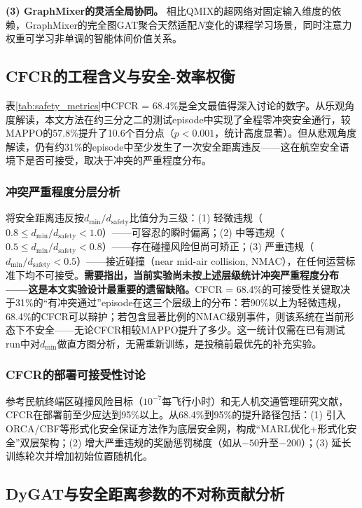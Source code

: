\documentclass[12pt,a4paper,UTF8]{ctexart}
\begin{document}
\textbf{(3) GraphMixer的灵活全局协同。} 相比QMIX的超网络对固定输入维度的依赖，GraphMixer的完全图GAT聚合天然适配$N$变化的课程学习场景，同时注意力权重可学习非单调的智能体间价值关系。

\subsection{CFCR的工程含义与安全-效率权衡}

表\ref{tab:safety_metrics}中CFCR = 68.4\%是全文最值得深入讨论的数字。从乐观角度解读，本文方法在约三分之二的测试episode中实现了全程零冲突安全通行，较MAPPO的57.8\%提升了10.6个百分点（$p<0.001$，统计高度显著）。但从悲观角度解读，仍有约31\%的episode中至少发生了一次安全距离违反——这在航空安全语境下是否可接受，取决于冲突的严重程度分布。

\subsubsection{冲突严重程度分层分析}

将安全距离违反按$d_{\min}/d_{\text{safety}}$比值分为三级：(1) 轻微违规（$0.8 \leq d_{\min}/d_{\text{safety}} < 1.0$）——可容忍的瞬时偏离；(2) 中等违规（$0.5 \leq d_{\min}/d_{\text{safety}} < 0.8$）——存在碰撞风险但尚可矫正；(3) 严重违规（$d_{\min}/d_{\text{safety}} < 0.5$）——接近碰撞（near mid-air collision, NMAC），在任何运营标准下均不可接受。\textbf{需要指出，当前实验尚未按上述层级统计冲突严重程度分布——这是本文实验设计最重要的遗留缺陷。}CFCR = 68.4\%的可接受性关键取决于31\%的``有冲突通过''episode在这三个层级上的分布：若90\%以上为轻微违规，68.4\%的CFCR可以辩护；若包含显著比例的NMAC级别事件，则该系统在当前形态下不安全——无论CFCR相较MAPPO提升了多少。这一统计仅需在已有测试run中对$d_{\min}$做直方图分析，无需重新训练，是投稿前最优先的补充实验。

\subsubsection{CFCR的部署可接受性讨论}

参考民航终端区碰撞风险目标（$10^{-7}$每飞行小时）和无人机交通管理研究文献，CFCR在部署前至少应达到95\%以上。从68.4\%到95\%的提升路径包括：(1) 引入ORCA/CBF等形式化安全保证方法作为底层安全网，构成``MARL优化+形式化安全''双层架构；(2) 增大严重违规的奖励惩罚梯度（如从$-50$升至$-200$）；(3) 延长训练轮次并增加初始位置随机化。

\subsection{DyGAT与安全距离参数的不对称贡献分析}
\end{document}
